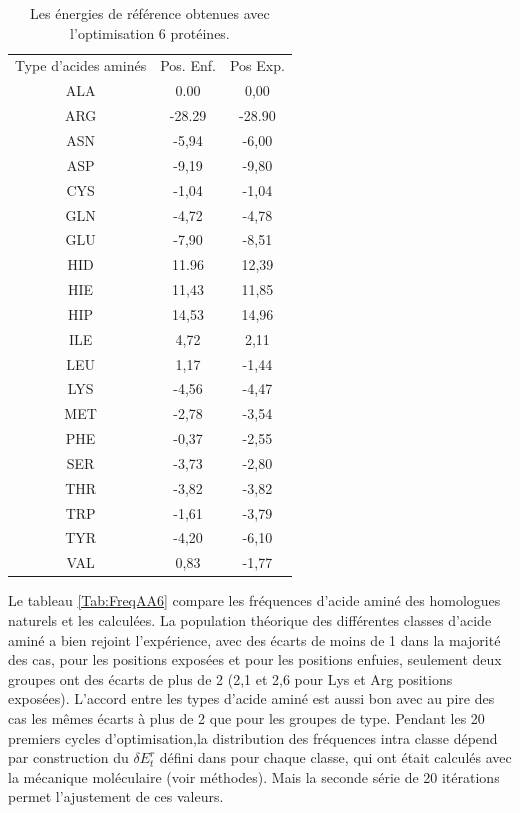     \begin{table}[!htbp]
      \centering
      \caption{Les énergies de référence obtenues avec l'optimisation 6 protéines.}
      \begin{tabular}{ccc}

        \toprule
        Type d'acides aminés & Pos. Enf. & Pos Exp. \\
        \cmidrule{1-3}

        ALA & 0.00     &  0,00     \\
        ARG & -28.29   &  -28.90   \\
        ASN & -5,94    &  -6,00    \\
        ASP & -9,19    &  -9,80    \\
        CYS & -1,04    &  -1,04    \\
        GLN & -4,72    &  -4,78    \\
        GLU & -7,90    &  -8,51    \\
        HID & 11.96    &  12,39    \\
        HIE & 11,43    &  11,85    \\
        HIP & 14,53    &  14,96    \\
        ILE & 4,72     &  2,11     \\
        LEU & 1,17     &  -1,44    \\
        LYS & -4,56    &  -4,47    \\
        MET & -2,78    &  -3,54    \\
        PHE & -0,37    &  -2,55    \\
        SER & -3,73    &  -2,80    \\
        THR & -3,82    &  -3,82    \\
        TRP & -1,61    &  -3,79    \\
        TYR & -4,20    &  -6,10    \\
        VAL & 0,83     &  -1,77    \\

        \bottomrule
      \end{tabular}      

\label{tab:RefEner6}      
    \end{table}

Le tableau \ref{Tab:FreqAA6} compare les fréquences d'acide aminé des homologues naturels et les calculées. La population théorique des différentes classes d'acide aminé a bien rejoint l'expérience, avec des écarts de moins de 1 dans la majorité des cas, pour les positions exposées et pour les positions enfuies, seulement deux groupes ont des écarts de plus de 2 (2,1 et 2,6 pour Lys et Arg positions exposées). L'accord entre les types d'acide aminé est aussi bon avec au pire des cas les mêmes écarts à plus de 2 que pour les groupes de type. Pendant les 20 premiers cycles d'optimisation,la distribution des fréquences intra classe dépend par construction du $\delta E_t^r$ défini dans pour chaque classe, qui ont était calculés avec la mécanique moléculaire (voir méthodes). Mais la seconde série de 20 itérations permet l'ajustement de ces valeurs. 


